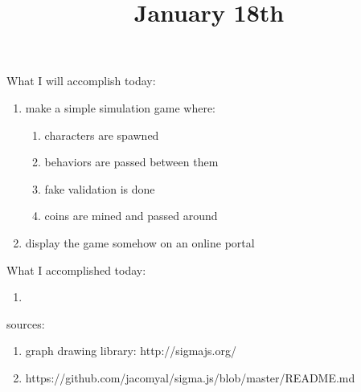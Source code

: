 \title{January 18th}


What I will accomplish today:

\begin{enumerate}
	\item make a simple simulation game where:
		\begin{enumerate}
			\item characters are spawned
			\item behaviors are passed between them
			\item fake validation is done 
			\item coins are mined and passed around
		\end{enumerate}
	\item display the game somehow on an online portal
\end{enumerate}

What I accomplished today:

\begin{enumerate}
	\item 
\end{enumerate}

sources:

\begin{enumerate}
	\item graph drawing library: http://sigmajs.org/
	\item https://github.com/jacomyal/sigma.js/blob/master/README.md
\end{enumerate}






